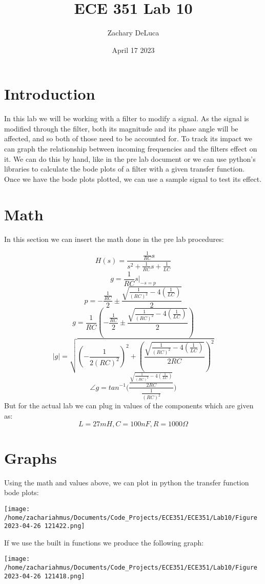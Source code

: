 \documentclass[12pt,a4paper]{article}
\title{ECE 351 Lab 10}
\author{Zachary DeLuca}
\date{April 17 2023}
\begin{document}
	
\maketitle
 \hline
\section*{Introduction}
In this lab we will be working with a filter to modify a signal. As the signal is modified through the filter, both its magnitude and its phase angle will be affected, and so both of those need to be accounted for. To track its impact we can graph the relationship between incoming frequencies and the filters effect on it. We can do this by hand, like in the pre lab document or we can use python's libraries to calculate the bode plots of a filter with a given transfer function. Once we have the bode plots plotted, we can use a sample signal to test its effect. 
\section*{Math}
In this section we can insert the math done in the pre lab procedures: 

$$H(s)=\frac{\frac{1}{RC}s}{s^2+\frac{1}{RC}s+\frac{1}{LC}}$$
$$g=\frac{1}{RC}s\bigg|_{-s=p}$$
$$p = -\frac{\frac{1}{RC}}{2}\pm \frac{\sqrt{\frac{1}{(RC)^2}-4(\frac{1}{LC})}}{2}$$
$$g=\frac{1}{RC}(-\frac{\frac{1}{RC}}{2}\pm \frac{\sqrt{\frac{1}{(RC)^2}-4(\frac{1}{LC})}}{2})$$
$$|g|=\sqrt{(-\frac{1}{2(RC)^2})^2+(\frac{\sqrt{\frac{1}{(RC)^2}-4(\frac{1}{LC})}}{2RC})^2}$$
$$\angle g = tan^{-1}\bigg(\frac{\frac{\sqrt{\frac{1}{(RC)^2}-4(\frac{1}{LC})}}{2RC}}{\frac{1}{(RC)^2}}\bigg)$$
But for the actual lab we can plug in values of the components which are given as: 
$$L=27mH,C=100nF,R=1000\Omega$$
\section*{Graphs}
Using the math and values above, we can plot in python the transfer function bode plots: \vspace*{12pt}

\texttt{[image: /home/zachariahmus/Documents/Code\_Projects/ECE351/ECE351/Lab10/Figure 2023-04-26 121422.png]}

If we use the built in functions we produce the following graph: \vspace*{12pt}

\texttt{[image: /home/zachariahmus/Documents/Code\_Projects/ECE351/ECE351/Lab10/Figure 2023-04-26 121418.png]} \vspace*{12pt}
\end{document}
